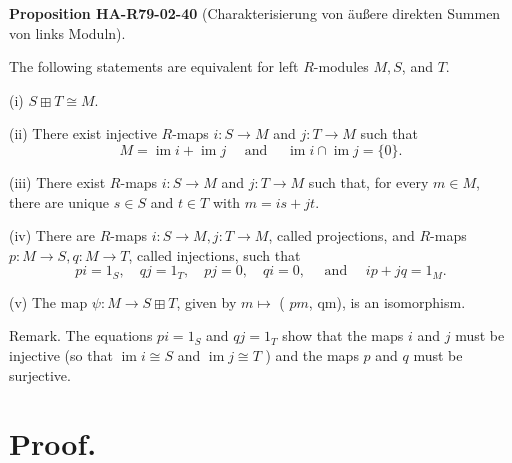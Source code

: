 \documentclass[10pt, letterpaper]{article}
\newcommand{\CustomHeading}[3]{%
  \par\medskip\noindent%
  \textbf{#1 #2} \textnormal{(#3)}.\enskip%
}
\newenvironment{PROP}[2]{\begin{unitbox}\CustomHeading{Proposition}{#1}{#2}}{\end{unitbox}}
\begin{document}
\begin{PROP}{HA-R79-02-40}{Charakterisierung von äußere direkten Summen von links Moduln}
The following statements are equivalent for left $R$-modules $M, S$, and $T$.

(i) $S \boxplus T \cong M$.

(ii) There exist injective $R$-maps $i: S \rightarrow M$ and $j: T \rightarrow M$ such that
$$
M=\operatorname{im} i+\operatorname{im} j \quad \text { and } \quad \operatorname{im} i \cap \operatorname{im} j=\{0\} .
$$

(iii) There exist $R$-maps $i: S \rightarrow M$ and $j: T \rightarrow M$ such that, for every $m \in M$, there are unique $s \in S$ and $t \in T$ with $m=i s+j t$.


(iv) There are $R$-maps $i: S \rightarrow M, j: T \rightarrow M$, called projections, and $R$-maps $p: M \rightarrow S, q: M \rightarrow T$, called injections, such that
$$
p i=1_{S}, \quad q j=1_{T}, \quad p j=0, \quad q i=0, \quad \text { and } \quad i p+j q=1_{M} .
$$

(v) The map $\psi: M \rightarrow S \boxplus T$, given by $m \mapsto$ ( $p m$, qm), is an isomorphism.

Remark. The equations $p i=1_{S}$ and $q j=1_{T}$ show that the maps $i$ and $j$ must be injective (so that $\operatorname{im} i \cong S$ and $\operatorname{im} j \cong T$ ) and the maps $p$ and $q$ must be surjective.
\end{PROP}


\section*{Proof.}
\end{document}
